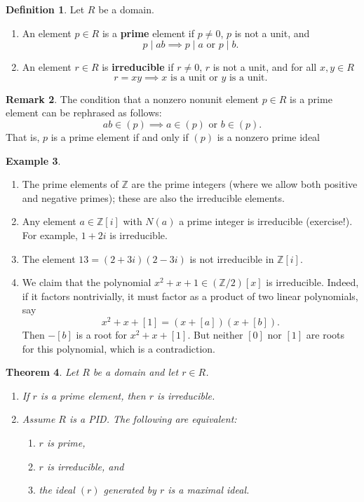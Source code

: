 \documentclass[12pt]{report}
\newtheorem{theorem}{Theorem}[chapter]
\numberwithin{equation}{section}
\numberwithin{theorem}{chapter}
\theoremstyle{definition}
\newtheorem{definition}[theorem]{Definition}
\newtheorem{example}[theorem]{Example}
\newtheorem*{basic properties}{Basic Properties}
\newtheorem*{Important Remark}{Important Remark}
\newtheorem{remark}[theorem]{Remark}
\newcommand{\Z}{\mathbb{Z}}
\begin{document}
\begin{definition} 
Let $R$ be a domain.
\begin{enumerate}
\item An element $p \in R$ is a {\bf prime} element if $p \neq 0$, $p$ is not a unit,  and 
  $$
  p \mid ab \implies p \mid a \text{ or } p \mid b.
  $$
\item An element $r \in R$ is {\bf irreducible} if $r\neq 0$, $r$ is not a unit, and for all $x,y \in R$
  $$
  r = xy \implies x \text{ is a unit or } y \text{ is a unit}.
  $$
\end{enumerate}
\end{definition}



\begin{remark}
The condition that a nonzero nonunit element $p \in R$ is a prime element can be rephrased as follows: 
$$ab \in (p) \implies a \in (p) \text{ or } b \in (p).$$
That is, $p$ is a prime element if and only if $(p)$ is a nonzero prime ideal 
\end{remark}


\begin{example}$\,$
\begin{enumerate}
\item The prime elements of $\Z$ are the prime integers (where we allow both positive and negative primes); these are also the irreducible elements.
\item Any element $a \in \Z[i]$ with $N(a)$ a prime integer is irreducible (exercise!). For example, $1+2i$ is irreducible.
\item The element $13=(2+3i)(2-3i)$ is not irreducible in $\Z[i]$.
\item We claim that the polynomial $x^2+x+1 \in (\Z/2)[x]$ is irreducible. Indeed, if it factors nontrivially, it must factor as a product of two linear polynomials, say 
$$x^2+x+[1]=(x+[a])(x+[b]).$$ 
Then $-[b]$ is a root for $x^2+x+[1]$. But neither $[0]$ nor $[1]$ are roots for this polynomial, which is a contradiction.
\end{enumerate}
 \end{example}
 

\begin{theorem}\label{domain prime irreducible elements}
Let $R$ be a domain and let $r\in R$. 
\begin{enumerate}
\item If $r$ is a prime element, then $r$ is irreducible. 
\item Assume $R$ is a PID. The following are equivalent:
  \begin{enumerate}
  \item $r$ is prime,
  \item $r$ is irreducible, and
    \item the ideal $(r)$ generated by $r$ is a maximal ideal.
    \end{enumerate}
    \end{enumerate}
\end{theorem}
\end{document}
